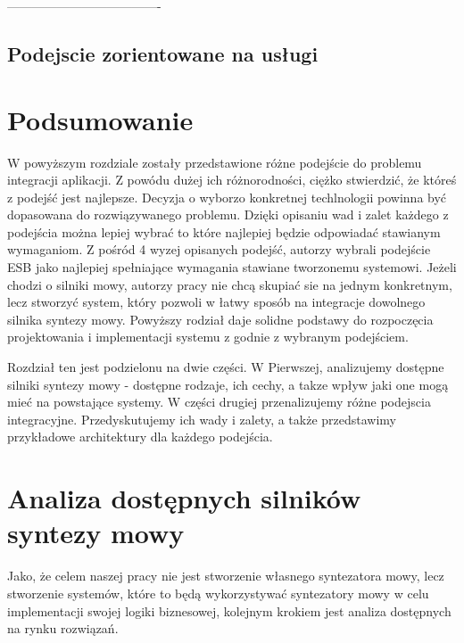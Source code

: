 -------------------------------------%

\subsection {Podejscie zorientowane na usługi}
 



\newpage
\section*{Podsumowanie}
W powyższym rozdziale zostały przedstawione różne podejście do problemu integracji aplikacji. Z powódu dużej ich różnorodności, ciężko stwierdzić, że któreś z podejść jest najlepsze. Decyzja o wyborzo konkretnej techlnologii powinna być dopasowana do rozwiązywanego problemu. Dzięki opisaniu wad i zalet każdego z podejścia można lepiej wybrać to które najlepiej będzie odpowiadać stawianym wymaganiom. Z pośród 4 wyzej opisanych podejść, autorzy wybrali podejście ESB jako najlepiej spełniające wymagania stawiane tworzonemu systemowi. Jeżeli chodzi o silniki mowy, autorzy pracy nie chcą skupiać sie na jednym  konkretnym, lecz stworzyć system, który pozwoli w łatwy sposób na integracje dowolnego silnika syntezy mowy. Powyższy rodział daje solidne podstawy do rozpoczęcia projektowania i implementacji systemu z godnie z wybranym podejściem.

Rozdział ten jest podzielonu na dwie części. W Pierwszej, analizujemy dostępne silniki syntezy mowy - dostępne rodzaje, ich cechy, a takze wpływ jaki one mogą mieć na powstające systemy. W części drugiej przenalizujemy różne podejscia integracyjne. Przedyskutujemy ich wady i zalety, a także przedstawimy przykładowe architektury dla każdego podejścia. 

\section {Analiza dostępnych silników syntezy mowy}

Jako, że celem naszej pracy nie jest stworzenie własnego syntezatora mowy, lecz stworzenie systemów, które to będą wykorzystywać syntezatory mowy w celu implementacji swojej logiki biznesowej, kolejnym krokiem jest analiza dostępnych na rynku rozwiązań. 

